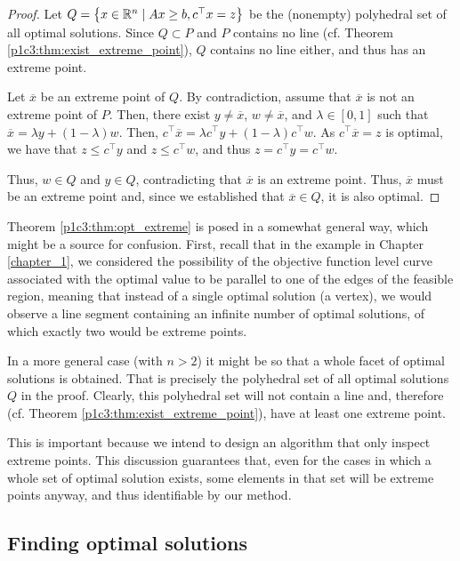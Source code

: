 \begin{proof}
	Let $Q = \left\{ x \in \mathbb{R}^n \mid Ax \geq b, c^\top x = z \right \}$ be the (nonempty) polyhedral set of all optimal solutions. Since $Q \subset P$ and $P$ contains no line (cf. Theorem \ref{p1c3:thm:exist_extreme_point}), $Q$ contains no line either, and thus has an extreme point.

	Let $\overline{x}$ be an extreme point of $Q$. By contradiction, assume that $\overline{x}$ is not an extreme point of $P$. Then, there exist $y \neq \overline{x}$, $w \neq \overline{x}$, and $\lambda \in [0,1]$ such that $\overline{x} = \lambda y + (1-\lambda)w$. Then, $c^\top \overline{x} = \lambda c^\top y + (1-\lambda)c^\top w$. As $c^\top \overline{x} = z$ is optimal, we have that $z \leq c^\top y$ and $z \leq c^\top w$,  and thus $z = c^\top y = c^\top w$. 
	
	Thus, $w \in Q$ and $y \in Q$, contradicting that $\overline{x}$ is an extreme point. Thus, $\overline{x}$ must be an extreme point and, since we established that $\overline{x} \in Q$, it is also optimal. 
\end{proof}

Theorem \ref{p1c3:thm:opt_extreme} is posed in a somewhat general way, which might be a source for confusion. First, recall that in the example in Chapter \ref{chapter_1}, we considered the possibility of the objective function level curve associated with the optimal value to be parallel to one of the edges of the feasible region, meaning that instead of a single optimal solution (a vertex), we would observe a line segment containing an infinite number of optimal solutions, of which exactly two would be extreme points. 

In a more general case (with $n > 2$) it might be so that a whole facet of optimal solutions is obtained. That is precisely the polyhedral set of all optimal solutions $Q$ in the proof. Clearly, this polyhedral set will not contain a line and, therefore (cf. Theorem \ref{p1c3:thm:exist_extreme_point}), have at least one extreme point. 

This is important because we intend to design an algorithm that only inspect extreme points. This discussion guarantees that, even for the cases in which a whole set of optimal solution exists, some elements in that set will be extreme points anyway, and thus identifiable by our method.


\subsection{Finding optimal solutions}

